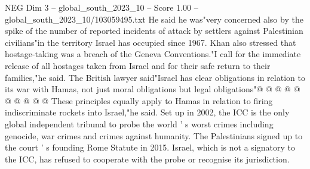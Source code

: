 \begin{textsample}{NEG Dim 3 – global\_south\_2023\_10 – Score 1.00 – global\_south\_2023\_10/103059495.txt}
He said he was"very concerned also by the spike of the number of reported incidents of attack by settlers against Palestinian civilians"in the territory Israel has occupied since 1967.
Khan also stressed that hostage-taking was a breach of the Geneva Conventions."I call for the immediate release of all hostages taken from Israel and for their safe return to their families,"he said.
The British lawyer said"Israel has clear obligations in relation to its war with Hamas, not just moral obligations but legal obligations"@ @ @ @ @ @ @ @ @ @ These principles equally apply to Hamas in relation to firing indiscriminate rockets into Israel,"he said.
Set up in 2002, the ICC is the only global independent tribunal to probe the world ' s worst crimes including genocide, war crimes and crimes against humanity.
The Palestinians signed up to the court ' s founding Rome Statute in 2015.
Israel, which is not a signatory to the ICC, has refused to cooperate with the probe or recognise its jurisdiction.

\end{textsample}
